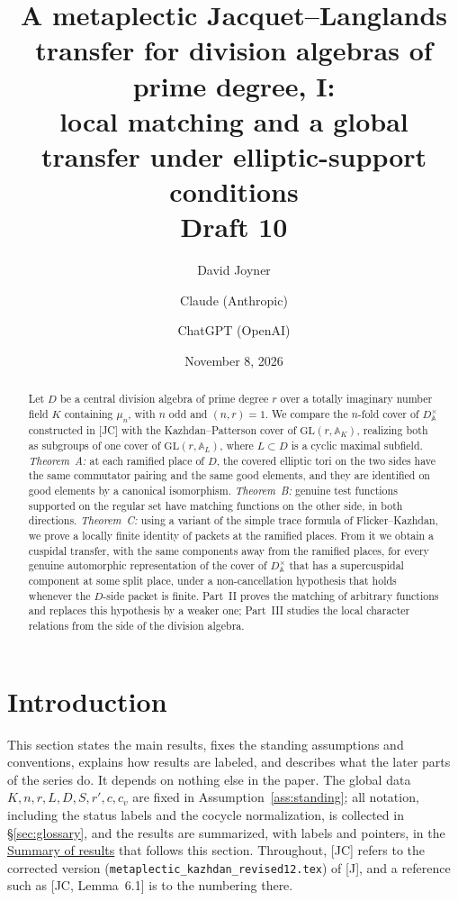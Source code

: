 \documentclass[12pt]{article}
\title{A metaplectic Jacquet--Langlands transfer for division algebras of prime degree, I:\\ local matching and a global transfer under elliptic-support conditions\\[0.4em]\normalsize Draft 10}
\author{David Joyner \and Claude (Anthropic) \and ChatGPT (OpenAI)}
\date{November 8, 2026}
\newcommand{\A}{\mathbb{A}}
\newcommand{\GL}{\mathrm{GL}}
\theoremstyle{plain}
\theoremstyle{definition}
\begin{document}
\maketitle

\begin{abstract}
Let $D$ be a central division algebra of prime degree $r$ over a totally imaginary number field $K$ containing $\mu_n$, with $n$ odd and $(n,r)=1$. We compare the $n$-fold cover of $D^\times_{\A}$ constructed in [JC] with the Kazhdan--Patterson cover of $\GL(r,\A_K)$, realizing both as subgroups of one cover of $\GL(r,\A_L)$, where $L\subset D$ is a cyclic maximal subfield. \emph{Theorem~A:} at each ramified place of $D$, the covered elliptic tori on the two sides have the same commutator pairing and the same good elements, and they are identified on good elements by a canonical isomorphism. \emph{Theorem~B:} genuine test functions supported on the regular set have matching functions on the other side, in both directions. \emph{Theorem~C:} using a variant of the simple trace formula of Flicker--Kazhdan, we prove a locally finite identity of packets at the ramified places. From it we obtain a cuspidal transfer, with the same components away from the ramified places, for every genuine automorphic representation of the cover of $D^\times_{\A}$ that has a supercuspidal component at some split place, under a non-cancellation hypothesis that holds whenever the $D$-side packet is finite. Part~II proves the matching of arbitrary functions and replaces this hypothesis by a weaker one; Part~III studies the local character relations from the side of the division algebra.
\end{abstract}

\tableofcontents

\section{Introduction}\label{sec:intro}
This section states the main results, fixes the standing assumptions and conventions, explains how results are labeled, and describes what the later parts of the series do. It depends on nothing else in the paper. The global data $K,n,r,L,D,S,r',c,c_v$ are fixed in Assumption~\ref{ass:standing}; all notation, including the status labels and the cocycle normalization, is collected in \S\ref{sec:glossary}, and the results are summarized, with labels and pointers, in the \hyperref[sec:summary]{Summary of results} that follows this section. Throughout, [JC] refers to the corrected version (\texttt{metaplectic\_kazhdan\_revised12.tex}) of [J], and a reference such as [JC, Lemma~6.1] is to the numbering there.
\end{document}
